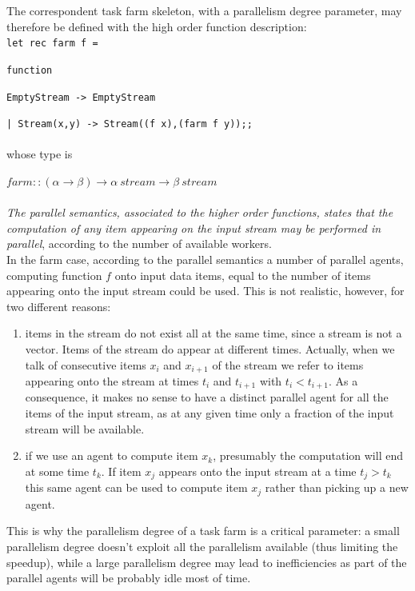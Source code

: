 The correspondent task farm skeleton, with a parallelism degree parameter, may therefore be defined with
the high order function description:\\
\texttt{let rec farm f =}
	
	\texttt{function}
	
	\texttt{EmptyStream -> EmptyStream}
	
	\texttt{| Stream(x,y) -> Stream((f x),(farm f y));;}\\\\
whose type is

\( farm :: (\alpha \rightarrow \beta) \rightarrow \alpha \  stream \rightarrow \beta \ stream \)\\\\
%
%
\textit{The parallel semantics, associated to the higher order functions, states that the computation of any item appearing on the input stream may be performed in parallel}, according to the number of available workers\cite{spm}.\\

In the farm case, according to the parallel semantics a number of parallel agents, computing function \(f\) onto input data items, equal to the number of items appearing onto the input stream could be used. This is not realistic, however, for two different reasons:

\begin{enumerate}
	\item items in the stream do not exist all at the same time, since a stream is not a vector.
	Items of the stream do appear at different times. Actually, when we talk of consecutive items \(x_{i}\) and \(x_{i+1}\) of the stream we refer to items appearing onto the stream at times \(t_{i}\) and \(t_{i+1}\) with \(t_{i} < t_{i+1}\). As a consequence, it makes no sense to have a distinct parallel agent for all the items of the input stream, as at any given time only a fraction of the input stream will be available.
	
	\item if we use an agent to compute item \(x_{k}\), presumably the computation will end at some
	time \(t_{k}\). If item \(x_{j}\) appears onto the input stream at a time \(t_{j} > t_{k}\) this same agent can be used to compute item \(x_{j}\) rather than picking up a new agent. \\
\end{enumerate}
This is why the parallelism degree of a task farm is a critical parameter: a small parallelism degree doesn't exploit all the parallelism available (thus limiting the speedup), while a large parallelism degree may lead to inefficiencies as part of the parallel agents will be probably idle most of time\cite{spm}.\\


